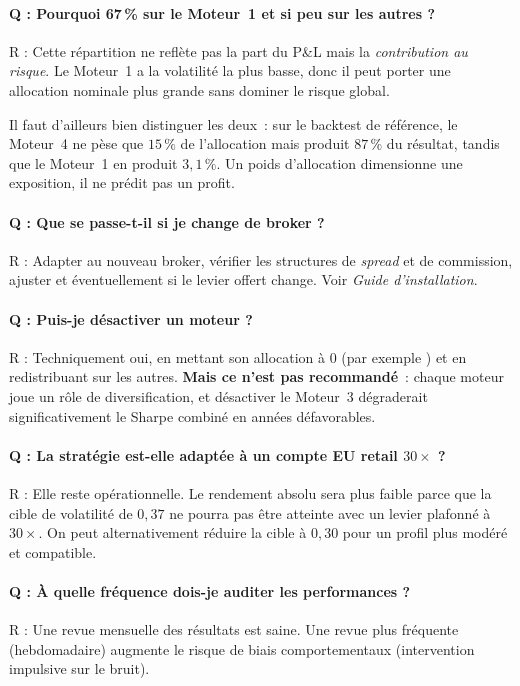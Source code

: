 \documentclass[11pt, a4paper]{scrartcl}
\begin{document}
\paragraph{Q : Pourquoi 67\,\% sur le Moteur~1 et si peu sur les autres ?}
R : Cette répartition ne reflète pas la part du P\&L mais la \emph{contribution au risque}. Le Moteur~1 a la volatilité la plus basse, donc il peut porter une allocation nominale plus grande sans dominer le risque global.

Il faut d'ailleurs bien distinguer les deux~: sur le backtest de référence, le Moteur~4 ne pèse que $15\,\%$ de l'allocation mais produit $87\,\%$ du résultat, tandis que le Moteur~1 en produit $3{,}1\,\%$. Un poids d'allocation dimensionne une exposition, il ne prédit pas un profit.

\paragraph{Q : Que se passe-t-il si je change de broker ?}
R : Adapter  au nouveau broker, vérifier les structures de \emph{spread} et de commission, ajuster  et éventuellement  si le levier offert change. Voir \emph{Guide d'installation}.

\paragraph{Q : Puis-je désactiver un moteur ?}
R : Techniquement oui, en mettant son allocation à $0$ (par exemple ) et en redistribuant sur les autres. \textbf{Mais ce n'est pas recommandé}~: chaque moteur joue un rôle de diversification, et désactiver le Moteur~3 dégraderait significativement le Sharpe combiné en années défavorables.

\paragraph{Q : La stratégie est-elle adaptée à un compte EU retail $30\times$ ?}
R : Elle reste opérationnelle. Le rendement absolu sera plus faible parce que la cible de volatilité de $0{,}37$ ne pourra pas être atteinte avec un levier plafonné à $30\times$. On peut alternativement réduire la cible à $0{,}30$ pour un profil plus modéré et compatible.

\paragraph{Q : À quelle fréquence dois-je auditer les performances ?}
R : Une revue mensuelle des résultats est saine. Une revue plus fréquente (hebdomadaire) augmente le risque de biais comportementaux (intervention impulsive sur le bruit).
\end{document}
